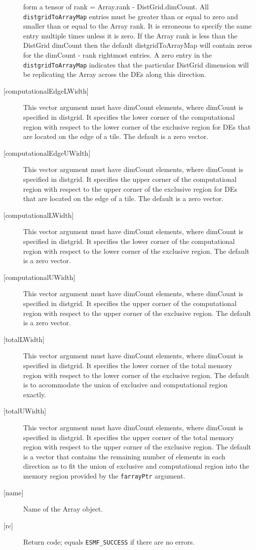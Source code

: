 \begin{description}
   form a tensor of rank = Array.rank - DistGrid.dimCount. 
   All {\tt distgridToArrayMap} entries must be greater than or equal 
   to zero and smaller than or equal to the Array rank. It is erroneous 
   to specify the same entry multiple times unless it is zero. 
   If the Array rank is less than the DistGrid dimCount then the default 
   distgridToArrayMap will contain zeros for the dimCount - rank 
   rightmost entries. A zero entry in the {\tt distgridToArrayMap} 
   indicates that the particular DistGrid dimension will be replicating 
   the Array across the DEs along this direction. 
   \item[{[computationalEdgeLWidth]}] 
   This vector argument must have dimCount elements, where dimCount is 
   specified in distgrid. It specifies the lower corner of the computational 
   region with respect to the lower corner of the exclusive region for DEs 
   that are located on the edge of a tile. 
   The default is a zero vector. 
   \item[{[computationalEdgeUWidth]}] 
   This vector argument must have dimCount elements, where dimCount is 
   specified in distgrid. It specifies the upper corner of the computational 
   region with respect to the upper corner of the exclusive region for DEs 
   that are located on the edge of a tile. 
   The default is a zero vector. 
   \item[{[computationalLWidth]}] 
   This vector argument must have dimCount elements, where dimCount is 
   specified in distgrid. It specifies the lower corner of the computational 
   region with respect to the lower corner of the exclusive region. 
   The default is a zero vector. 
   \item[{[computationalUWidth]}] 
   This vector argument must have dimCount elements, where dimCount is 
   specified in distgrid. It specifies the upper corner of the computational 
   region with respect to the upper corner of the exclusive region. 
   The default is a zero vector. 
   \item[{[totalLWidth]}] 
   This vector argument must have dimCount elements, where dimCount is 
   specified in distgrid. It specifies the lower corner of the total memory 
   region with respect to the lower corner of the exclusive region. 
   The default is to accommodate the union of exclusive and computational 
   region exactly. 
   \item[{[totalUWidth]}] 
   This vector argument must have dimCount elements, where dimCount is 
   specified in distgrid. It specifies the upper corner of the total memory 
   region with respect to the upper corner of the exclusive region. 
   The default is a vector that contains the remaining number of elements 
   in each direction as to fit the union of exclusive and computational 
   region into the memory region provided by the {\tt farrayPtr} argument. 
   \item[{[name]}] 
   Name of the Array object. 
   \item[{[rc]}] 
   Return code; equals {\tt ESMF\_SUCCESS} if there are no errors. 
   \end{description} 
    
